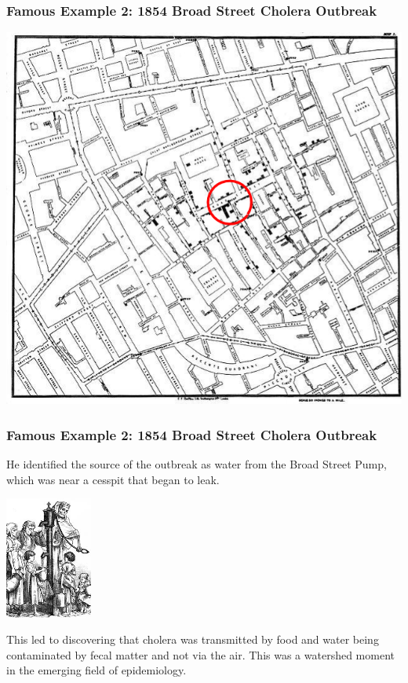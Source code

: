 \documentclass[handout]{beamer}
\newcommand{\blue}[1]{\textcolor{blue2}{#1}}
\begin{document}
\begin{frame}
\frametitle{Famous Example 2:  1854 Broad Street Cholera Outbreak}

\begin{center}
\includegraphics[height=0.8\textheight]{figure/cholera2.png}
\end{center}

\end{frame}


\begin{frame}
\frametitle{Famous Example 2:  1854 Broad Street Cholera Outbreak}

He identified the source of the outbreak as water from the \blue{Broad Street Pump}, which was near a cesspit that began to leak. 

\begin{center}
\includegraphics[height=4cm]{figure/king_cholera.jpg}
\end{center}

\pause This led to discovering that cholera was transmitted by food and water being contaminated by fecal matter and not via the air.  This was a watershed moment in the emerging field of \blue{epidemiology}.  

\end{frame}
\end{document}
